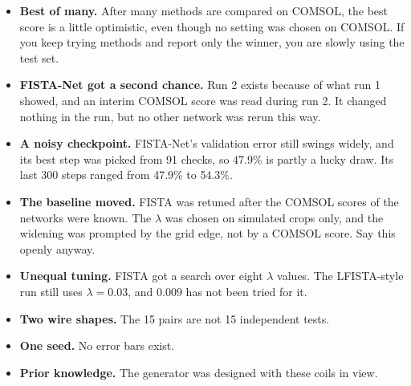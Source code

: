\begin{careful}
\begin{itemize}
\item \textbf{Best of many.} After many methods are compared on COMSOL, the best score is a little optimistic, even though
no setting was chosen on COMSOL. If you keep trying methods and report only the winner, you are slowly using the test set.
\item \textbf{FISTA-Net got a second chance.} Run 2 exists because of what run 1 showed, and an interim COMSOL score was read
during run 2. It changed nothing in the run, but no other network was rerun this way.
\item \textbf{A noisy checkpoint.} FISTA-Net's validation error still swings widely, and its best step was picked from 91
checks, so 47.9\% is partly a lucky draw. Its last 300 steps ranged from 47.9\% to 54.3\%.
\item \textbf{The baseline moved.} FISTA was retuned after the COMSOL scores of the networks were known. The $\lambda$ was chosen on
simulated crops only, and the widening was prompted by the grid edge, not by a COMSOL score. Say this openly anyway.
\item \textbf{Unequal tuning.} FISTA got a search over eight $\lambda$ values. The LFISTA-style run still uses
$\lambda=0.03$, and $0.009$ has not been tried for it.
\item \textbf{Two wire shapes.} The 15 pairs are not 15 independent tests.
\item \textbf{One seed.} No error bars exist.
\item \textbf{Prior knowledge.} The generator was designed with these coils in view.
\end{itemize}
\end{careful}
